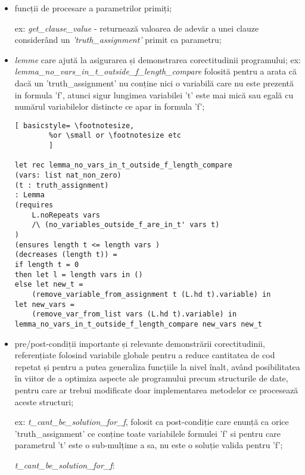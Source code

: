 \begin{itemize}
	\item  funcții de procesare a parametrilor primiți;
		
	ex: \textit{get\_clause\_value }- returnează valoarea de adevăr a unei clauze considerând un \textit{'truth\_assignment'} primit ca parametru;
	
	\item \textit{lemme} care ajută la asigurarea și demonstrarea corectitudinii programului;
	ex: \textit{lemma\_no\_vars\_in\_t\_outside\_f\_length\_compare} folosită pentru a arata că dacă un 'truth\_assignment' nu conține nici o variabilă care nu este prezentă in formula 'f', atunci sigur lungimea variabilei 't' este mai mică sau egală cu numărul variabilelor distincte ce apar in formula 'f';
	
	\begin{lstlisting}[	basicstyle= \footnotesize, 
		%or \small or \footnotesize etc
		]

let rec lemma_no_vars_in_t_outside_f_length_compare
(vars: list nat_non_zero) 
(t : truth_assignment) 
: Lemma
(requires 
	L.noRepeats vars 
	/\ (no_variables_outside_f_are_in_t' vars t)
)
(ensures length t <= length vars ) 
(decreases (length t)) = 
if length t = 0
then let l = length vars in ()
else let new_t = 
	(remove_variable_from_assignment t (L.hd t).variable) in
let new_vars = 
	(remove_var_from_list vars (L.hd t).variable) in
lemma_no_vars_in_t_outside_f_length_compare new_vars new_t

	\end{lstlisting}
	
	\item pre/post-condiții importante și relevante demonstrării corectitudinii, referențiate folosind variabile globale pentru a reduce cantitatea de cod repetat și pentru a putea generaliza funcțiile la nivel înalt, având posibilitatea în viitor de a \newline optimiza aspecte ale programului precum structurile de date, pentru care ar \newline trebui modificate doar implementarea metodelor ce procesează aceste structuri;
	
	ex: \textit{t\_cant\_be\_solution\_for\_f}, folosit ca post-condiție care enunță ca orice 'truth\_assignment' ce conține toate variabilele formulei 'f' si pentru care parametrul 't' este o sub-mulțime a sa, nu este o soluție valida pentru 'f';
	
	\textit{t\_cant\_be\_solution\_for\_f}:
	

\end{itemize}
